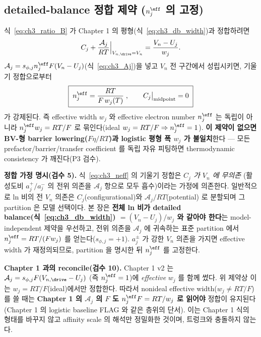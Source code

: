 \subsection{detailed-balance 정합 제약 ($n_j^{\eff}$ 의 고정)}\label{sec:ch3_neff}
식~\eqref{eq:ch3_ratio_B} 가 Chapter 1 의 평형(식~\eqref{eq:ch3_db_width})과 정합하려면
\begin{equation}
C_j+\frac{\mathcal A_j}{RT}\Big|_{V_{n,\drive}=V_n}=\frac{V_n-U_j}{w_j}.
\label{eq:ch3_dbmatch}
\end{equation}
$\mathcal A_j=s_{\phi,j}n_j^{\eff}F(V_n-U_j)$(식~\eqref{eq:ch3_Aj})을 넣고 $V_n$ 전 구간에서 성립시키면, 기울기
정합으로부터
\begin{equation}
\boxed{\;n_j^{\eff}=\frac{RT}{F\,w_j(T)}\;,\qquad C_j\big|_{\text{midpoint}}=0\;}
\label{eq:ch3_neff}
\end{equation}
가 강제된다. 즉 effective width $w_j$ 와 effective electron number $n_j^{\eff}$ 는 독립이 아니라
$n_j^{\eff}w_j=RT/F$ 로 묶인다(ideal $w_j=RT/F\Rightarrow n_j^{\eff}=1$). \textbf{이 제약이 없으면 BV-형
barrier lowering($Fη/RT$)과 logistic 평형 폭 $w_j$ 가 불일치}한다 — 모든 prefactor/barrier/transfer
coefficient 를 독립 자유 피팅하면 thermodynamic consistency 가 깨진다(P3 검수).
\begin{boundbox}
\textbf{정합 가정 명시(검수 5).} 식~\eqref{eq:ch3_neff} 의 기울기 정합은 \emph{$C_j$ 가 $V_n$ 에 무의존}
(활성도비 $a_j^+/a_j^-$ 의 전위 의존을 $\mathcal A_j$ 항으로 모두 흡수)이라는 가정에 의존한다. 일반적으로
ln 비의 전 $V_n$ 의존은 $C_j$(configurational)와 $\mathcal A_j/RT$(potential) 로 분할되며 그 partition 은
모델 선택이다. 본 장은 \textbf{전체 ln 비가 detailed balance(식~\eqref{eq:ch3_db_width}) $=(V_n-U_j)/w_j$ 와
같아야 한다}는 model-independent 제약을 우선하고, 전위 의존을 $\mathcal A_j$ 에 귀속하는 표준 partition 에서
$n_j^{\eff}=RT/(Fw_j)$ 를 얻는다($s_{\phi,j}=+1$). $a_j^\pm$ 가 강한 $V_n$ 의존을 가지면 effective width 가
재정의되므로, partition 을 명시한 뒤 $n_j^{\eff}$ 를 고정한다.
\end{boundbox}
\begin{boundbox}
\textbf{Chapter 1 과의 reconcile(검수 10).} Chapter 1 v2 는 $\mathcal A_j=s_{\phi,j}F(V_{n,\drive}-U_j)$
(즉 $n_j^{\eff}=1$)에 \emph{effective} $w_j$ 를 함께 썼다. 위 제약상 이는 $w_j=RT/F$(ideal)에서만 정합한다.
따라서 nonideal effective width($w_j\ne RT/F$)를 쓸 때는 \textbf{Chapter 1 의 $\mathcal A_j$ 의 $F$ 도
$n_j^{\eff}F=RT/w_j$ 로 읽어야} 정합이 유지된다(Chapter 1 의 logistic baseline FLAG 와 같은 층위의 단서).
이는 Chapter 1 식의 형태를 바꾸지 않고 affinity scale 의 해석만 정밀화한 것이며, 트렁크와 충돌하지 않는다.
\end{boundbox}

